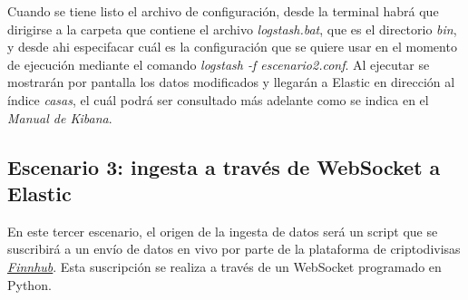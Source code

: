 Cuando se tiene listo el archivo de configuración, desde la terminal habrá que dirigirse a la carpeta que contiene el archivo \textit{logstash.bat}, que es el directorio \textit{bin}, y desde ahi especifacar cuál es la configuración que se quiere usar en el momento de ejecución mediante el comando \textit{logstash -f escenario2.conf}. Al ejecutar se mostrarán por pantalla los datos modificados y llegarán a Elastic en dirección al índice \textit{casas}, el cuál podrá ser consultado más adelante como se indica en el \textit{Manual de Kibana}.

\paragraph{}
\paragraph{}
\paragraph{}
\paragraph{}
\paragraph{}


\subsection{Escenario 3: ingesta a través de WebSocket a Elastic}
En este tercer escenario, el origen de la ingesta de datos será un script que se suscribirá a un envío de datos en vivo por parte de la plataforma de criptodivisas \href{https://finnhub.io/docs/api/websocket-trades}{\textit{Finnhub}}. Esta suscripción se realiza a través de un WebSocket programado en Python.

